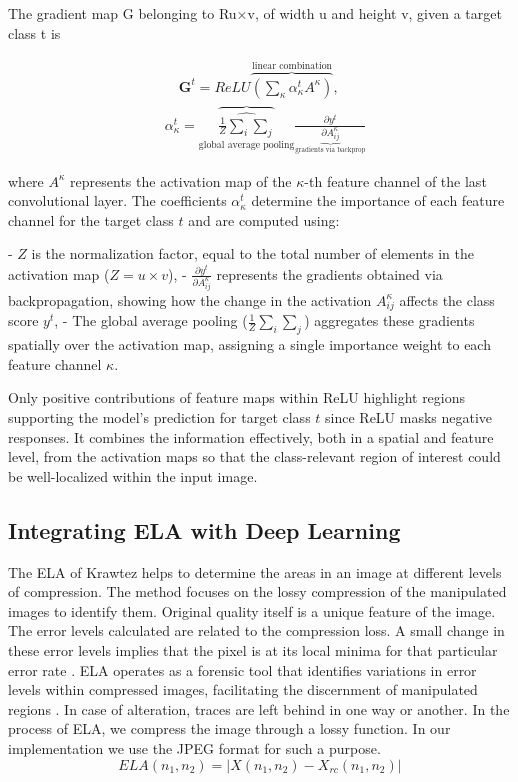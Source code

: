 \documentclass{ieeeaccess}
\begin{document}
The gradient map G belonging to Ru×v, of width u and height v, given a target class t is

\begin{align*}&\quad \displaystyle \mathbf{G}^{t}=ReLU\overbrace{\left(\sum\limits_{\kappa}\alpha_{\kappa}^{t}A^{\kappa}\right)}^{\text{linear combination}}, \tag{2}\\ & \alpha_{\kappa}^{t}= \overbrace{\hat{\frac{1}{Z}\sum_{i}\sum_{j}}}_{\text{global average pooling}} \frac{\partial y^{t}}{\underbrace{\partial A_{ij}^{\kappa}}_{\text{gradients via backprop}}} \tag{3} \end{align*}

where \( A^{\kappa} \) represents the activation map of the \(\kappa\)-th feature channel of the last convolutional layer. The coefficients \( \alpha_{\kappa}^{t} \) determine the importance of each feature channel for the target class \( t \) and are computed using:

- \( Z \) is the normalization factor, equal to the total number of elements in the activation map (\( Z = u \times v \)),
- \( \frac{\partial y^{t}}{\partial A_{ij}^{\kappa}} \) represents the gradients obtained via backpropagation, showing how the change in the activation \( A_{ij}^{\kappa} \) affects the class score \( y^{t} \),
- The global average pooling (\( \frac{1}{Z} \sum_{i} \sum_{j} \)) aggregates these gradients spatially over the activation map, assigning a single importance weight to each feature channel \( \kappa \).

Only positive contributions of feature maps within ReLU highlight regions supporting the model's prediction for target class \( t \) since ReLU masks negative responses. It combines the information effectively, both in a spatial and feature level, from the activation maps so that the class-relevant region of interest could be well-localized within the input image.

\subsection{Integrating ELA with Deep Learning}
The ELA of Krawtez \cite{krawtez2007pictures} helps to determine the areas in an image at different levels of compression. The method focuses on the lossy compression of the manipulated images to identify them. Original quality itself is a unique feature of the image. The error levels calculated are related to the compression loss. A small change in these error levels implies that the pixel is at its local minima for that particular error rate \cite{ghai2024deep}.
ELA operates as a forensic tool that identifies variations in error levels within compressed images, facilitating the discernment of manipulated regions \cite{10627878}. In case of alteration, traces are left behind in one way or another. In the process of ELA, we compress the image through a lossy function. In our implementation we use the JPEG format for such a purpose.
\begin{equation}
	ELA(n_1, n_2) = \left| X(n_1, n_2) - X_{rc}(n_1, n_2) \right| \tag{4}
\end{equation}
\end{document}
